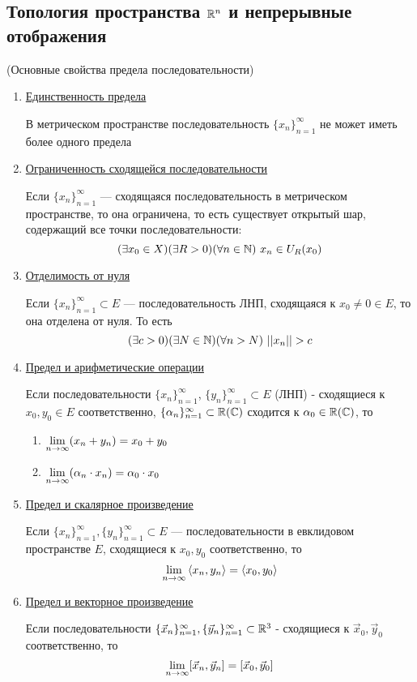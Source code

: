 \subsection{Топология пространства $\mathbb{R}^n$ и непрерывные отображения}

\begin{theorem} (Основные свойства предела последовательности)
	\begin{enumerate}
		\item \underline{Единственность предела}
			
			В метрическом пространстве
			последовательность $\{x_n\}_{n = 1}^\infty$ не может
			иметь более одного предела
		
		\item \underline{Ограниченность сходящейся последовательности}
		
			Если $\{x_n\}_{n = 1}^\infty$ --- сходящаяся последовательность 
			в метрическом пространстве,
			то она ограничена, то есть существует открытый шар, содержащий
			все точки последовательности:
			\[
				(\exists x_0 \in X)(\exists R > 0)(\forall n \in \mathbb{N})\ x_n \in U_R(x_0)
			\] 
		
		\item \underline{Отделимость от нуля}
		
			Если $\{x_n\}_{n = 1}^\infty \subset E$ ---
			последовательность ЛНП, сходящаяся
			к $x_0 \neq 0 \in E$, то она отделена от нуля. То есть
			\[
				(\exists c > 0)(\exists N \in \mathbb{N})(\forall n > N)\ ||x_n|| > c
			\]
			
		\item \underline{Предел и арифметические операции}
		
			Если последовательности $\{x_n\}_{n = 1}^\infty$,
			$\{y_n\}_{n = 1}^\infty \subset E$ (ЛНП) - сходящиеся к
			$x_0, y_0 \in E$ соответственно,
			$\{\alpha_n\}_{n = 1}^\infty \subset \mathbb{R}(\mathbb{C})$ сходится к
			$\alpha_0 \in \mathbb{R}(\mathbb{C})$, то
			\begin{enumerate}
				\item $\lim\limits_{n \to \infty} (x_n + y_n) = x_0 + y_0$
				
				\item $\lim\limits_{n \to \infty} (\alpha_n \cdot x_n) =
					\alpha_0 \cdot x_0$
			\end{enumerate}
	
		\item \underline{Предел и скалярное произведение}
		
			Если $\{x_n\}_{n = 1}^\infty, \{y_n\}_{n = 1}^\infty \subset E$
			--- последовательности в евклидовом пространстве $E$,
			сходящиеся к $x_0, y_0$ соответственно, то
			\[
				\lim\limits_{n \to \infty} \left\langle x_n, y_n\right\rangle = \left\langle x_0, y_0\right\rangle
			\]
		
		\item \underline{Предел и векторное произведение}
		
			Если последовательности
			$\{\vec{x}_n\}_{n = 1}^\infty,
			\{\vec{y}_n\}_{n = 1}^\infty \subset \mathbb{R}^3$ -
			сходящиеся к $\vec{x}_0, \vec{y}_0$ соответственно, то
			\[
				\lim\limits_{n \to \infty} [\vec{x}_n, \vec{y}_n] =
				[\vec{x}_0, \vec{y}_0]
			\]
	\end{enumerate}
\end{theorem}

